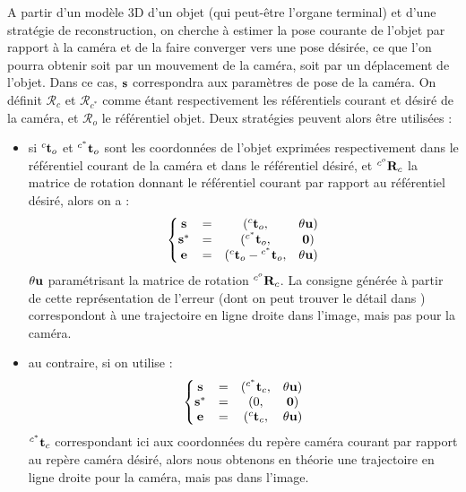 A partir d'un mod\`ele 3D d'un objet (qui peut-\^etre l'organe terminal) et d'une strat\'egie de reconstruction, on cherche \`a estimer la pose courante de l'objet par rapport \`a la cam\'era et de la faire converger vers une pose d\'esir\'ee, ce que l'on pourra obtenir soit par un mouvement de la cam\'era, soit par un d\'eplacement de l'objet. Dans ce cas, ${\bf s}$ correspondra aux param\`etres de pose de la cam\'era. On d\'efinit $\mathcal R_c$ et $\mathcal R_{c^*}$ comme \'etant respectivement les r\'ef\'erentiels courant et d\'esir\'e de la cam\'era, et $\mathcal R_o$ le r\'ef\'erentiel objet. Deux strat\'egies peuvent alors \^etre utilis\'ees :
\begin{itemize}
 \item si ${}^c{\bf t}_o$ et ${}^{c^*}{\bf t}_o$ sont les coordonn\'ees de l'objet exprim\'ees respectivement dans le r\'ef\'erentiel courant de la cam\'era et dans le r\'ef\'erentiel d\'esir\'e, et ${}^{c^o}{\bf R}_c$ la matrice de rotation donnant le r\'ef\'erentiel courant par rapport au r\'ef\'erentiel d\'esir\'e, alors on a :
 \begin{equation}
 \left \lbrace
 \begin{matrix}
  {\bf s} &=& ({}^c{\bf t}_o,& \theta {\bf u}) \\
  {\bf s}^* &=& ({}^{c^*}{\bf t}_o,& {\bf 0}) \\
  {\bf e} &=& ({}^c{\bf t}_o - {}^{c^*}{\bf t}_o,& \theta {\bf u})
 \end{matrix}
  \right .
\label{chap01:eq11}
\end{equation}
$\theta {\bf u}$ param\'etrisant la matrice de rotation ${}^{c^o}{\bf R}_c$. La consigne g\'en\'er\'ee \`a partir de cette repr\'esentation de l'erreur (dont on peut trouver le d\'etail dans \cite{chaumette:tuto01}) correspondont \`a une trajectoire en ligne droite dans l'image, mais pas pour la cam\'era.
\item au contraire, si on utilise :
\begin{equation}
 \left \lbrace
 \begin{matrix}
  {\bf s} &=& ({}^{c^*}{\bf t}_c,& \theta {\bf u}) \\
  {\bf s}^* &=& (0,& {\bf 0}) \\
  {\bf e} &=& ({}^c{\bf t}_c,& \theta {\bf u})
 \end{matrix}
  \right .
\label{chap01:eq12}
\end{equation}
${}^{c^*}{\bf t}_c$ correspondant ici aux coordonn\'ees du rep\`ere cam\'era courant par rapport au rep\`ere cam\'era d\'esir\'e, alors nous obtenons en th\'eorie une trajectoire en ligne droite pour la cam\'era, mais pas dans l'image. 
\end{itemize}

